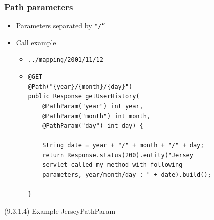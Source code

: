 \documentclass[10pt,xcolor=pdflatex]{beamer}
\begin{document}
\begin{frame}[containsverbatim]\frametitle{Path parameters}
\begin{itemize}
	\item Parameters separated by \texttt{"/”}
    \item Call example
	  \begin{itemize}
		\item \texttt{../mapping/2001/11/12}
        \vspace*{.5cm}
        \item[] \begin{footnotesize}
        \begin{verbatim}
@GET
@Path("{year}/{month}/{day}")
public Response getUserHistory(
    @PathParam("year") int year,
    @PathParam("month") int month,
    @PathParam("day") int day) {

    String date = year + "/" + month + "/" + day;
    return Response.status(200).entity("Jersey 
    servlet called my method with following 
    parameters, year/month/day : " + date).build();
 
}
        \end{verbatim}
        \end{footnotesize}
	  \end{itemize}
\end{itemize}
\begin{textblock}{5}(9.3,1.4)
    {\footnotesize Example JerseyPathParam}
\end{textblock}
\end{frame}
\end{document}
